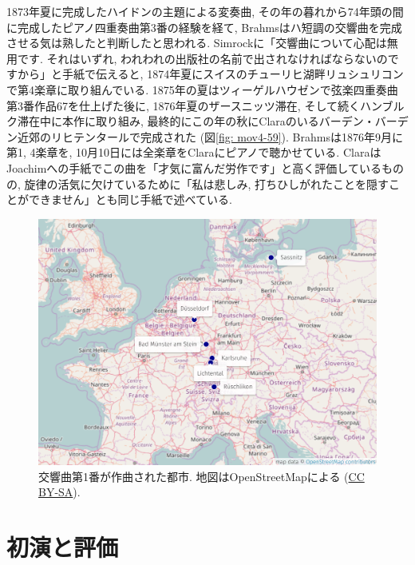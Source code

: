 1873年夏に完成したハイドンの主題による変奏曲, その年の暮れから74年頭の間に完成したピアノ四重奏曲第3番の経験を経て, Brahmsはハ短調の交響曲を完成させる気は熟したと判断したと思われる.
Simrockに「交響曲について心配は無用です. それはいずれ, われわれの出版社の名前で出されなければならないのですから」と手紙で伝える\cite{ogt}と,
1874年夏にスイスのチューリヒ湖畔リュシュリコンで第4楽章に取り組んでいる.
1875年の夏はツィーゲルハウゼンで弦楽四重奏曲第3番作品67を仕上げた\cite{compos}後に, 1876年夏のザースニッツ滞在,
そして続くハンブルク滞在中に本作に取り組み, 最終的にこの年の秋にClaraのいるバーデン・バーデン近郊のリヒテンタールで完成された (図\ref{fig: mov4-59}).
Brahmsは1876年9月に第1, 4楽章を, 10月10日には全楽章をClaraにピアノで聴かせている.
ClaraはJoachimへの手紙でこの曲を「才気に富んだ労作です」と高く評価しているものの, 旋律の活気に欠けているために「私は悲しみ,
打ちひしがれたことを隠すことができません」とも同じ手紙で述べている\cite{compos}.

\begin{figure}[htbp]
	\begin{center}
    \includegraphics[clip,width=12.0cm]{./figure/map-composition.png}
	\caption{交響曲第1番が作曲された都市.
		地図はOpenStreetMapによる (\href{http://www.openstreetmap.org/copyright}{CC BY-SA}).}
    \label{fig: concert}
	\end{center}
\end{figure}


\section{初演と評価}\label{sec: premiere}

